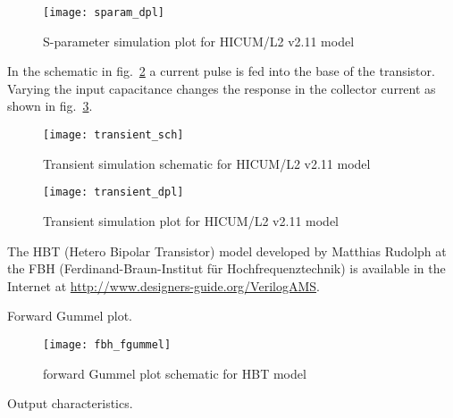 \begin{figure}[ht]
\begin{center}
\texttt{[image: sparam\_dpl]}
\end{center}
\caption{S-parameter simulation plot for HICUM/L2 v2.11 model}
\label{fig:sparam_dpl}
\end{figure}
\FloatBarrier


In the schematic in fig.~\ref{fig:transient_sch} a current pulse is
fed into the base of the transistor.  Varying the input capacitance
changes the response in the collector current as shown in
fig.~\ref{fig:transient_dpl}.

\begin{figure}[ht]
\begin{center}
\texttt{[image: transient\_sch]}
\end{center}
\caption{Transient simulation schematic for HICUM/L2 v2.11 model}
\label{fig:transient_sch}
\end{figure}
\FloatBarrier

\begin{figure}[ht]
\begin{center}
\texttt{[image: transient\_dpl]}
\end{center}
\caption{Transient simulation plot for HICUM/L2 v2.11 model}
\label{fig:transient_dpl}
\end{figure}
\FloatBarrier


The HBT (Hetero Bipolar Transistor) model developed by Matthias
Rudolph at the FBH (Ferdinand-Braun-Institut f\"ur Hochfrequenztechnik)
is available in the Internet at
\url{http://www.designers-guide.org/VerilogAMS}.


Forward Gummel plot.

\begin{figure}[ht]
\begin{center}
\texttt{[image: fbh\_fgummel]}
\end{center}
\caption{forward Gummel plot schematic for HBT model}
\label{fig:fbh_fgummel}
\end{figure}
\FloatBarrier


Output characteristics.

